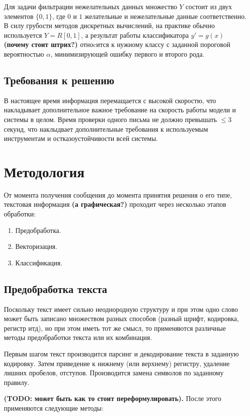 \documentclass[12pt]{article}
\begin{document}
Для задачи фильтрации нежелательных данных множество $Y$ состоит из двух элементов $\{0, 1\}$, где $0$ и $1$ желательные и нежелательные данные соответственно. В силу грубости методов дискретных вычислений, на практике обычно используется $Y = R[0, 1]$, а результат работы классификатора $y' = g(x)$ {\bf\color{amaranth} (почему стоит штрих?)} отноcится к нужному классу с заданной пороговой вероятностью $\alpha$, минимизирующей ошибку первого и второго рода.

\subsection{Требования к решению}
В настоящее время информация перемащается с высокой скоростю, что накладывает дополнительное важное требование на скорость работы модели и системы в целом. Время проверки одного письма не должно превышать $\leqslant 3$ секунд, что наклыдвает дополнительные требования к используемым инструментам и остказоустойчивости всей системы. 

\section{Методология}

От момента получения сообщения до момента принятия решения о его типе, текстовая информация {\bf\color{amaranth} (а графическая?)} проходит через несколько этапов обработки:
\begin{enumerate}
\item Предобработка.
\item Векторизация.
\item Классификация.
\end{enumerate}

\subsection{Предобработка текста}
Поскольку текст имеет сильно неоднородную структуру и при этом одно слово может быть записано множеством разных способов (разный шрифт, кодировка, регистр итд), но при этом иметь тот же смысл, то применяются различные методы предобработки текста или их комбинация.

Первым шагом текст производится парсинг и декодирование текста в заданную кодировку. Затем приведение к нижнему (или верхнему) регистру, удаление лишних пробелов, отступов. Производится замена символов по заданному правилу.

{\bf\color{amaranth} (TODO: может быть как то стоит переформулировать).}
После этого применяются следующие методы:
\end{document}
